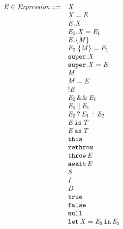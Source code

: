 \documentclass{article}
\begin{document}
\[
\begin{array}{rl}
  \mathit{E} \in \mathit{Expression} ::=
  & \mathit{X} \\
  & \mathit{X}=\mathit{E} \\
  & \mathit{E}.\mathit{X} \\
  & \mathit{E}_0.\mathit{X}=\mathit{E}_1 \\
  & \mathit{E}.\{\mathit{M}\} \\
  & \mathit{E}_0.\{\mathit{M}\}=\mathit{E}_1 \\
  & \tt{super}.\mathit{X} \\
  & \tt{super}.\mathit{X}=\mathit{E} \\
  & \mathit{M} \\
  & \mathit{M}=\mathit{E} \\
  & !\mathit{E} \\
  & \mathit{E}_0\,\&\&\,\mathit{E}_1 \\
  & \mathit{E}_0\,||\,\mathit{E}_1 \\
  & \mathit{E}_0\,?\,\mathit{E}_1\,:\,\mathit{E}_2 \\
  & \mathit{E}\,\tt{is}\,\mathit{T} \\
  & \mathit{E}\,\tt{as}\,\mathit{T} \\
  & \tt{this} \\
  & \tt{rethrow} \\
  & \tt{throw}\,\mathit{E} \\
  & \tt{await\,\ensuremath{\mathit{E}}} \\
  & \mathit{S} \\
  & \mathit{I} \\
  & \mathit{D} \\
  & \tt{true} \\
  & \tt{false} \\
  & \tt{null} \\
  & \tt{let}\,\mathit{X}=\mathit{E}_0\,\tt{in}\,\mathit{E}_1 \\
\end{array}
\]
\end{document}

